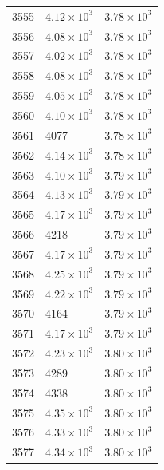 \begin{table}[H]
\begin{tabular}{lll}
3555 & $\displaystyle 4.12 \times 10^{3}$ & $\displaystyle 3.78 \times 10^{3}$ \\
3556 & $\displaystyle 4.08 \times 10^{3}$ & $\displaystyle 3.78 \times 10^{3}$ \\
3557 & $\displaystyle 4.02 \times 10^{3}$ & $\displaystyle 3.78 \times 10^{3}$ \\
3558 & $\displaystyle 4.08 \times 10^{3}$ & $\displaystyle 3.78 \times 10^{3}$ \\
3559 & $\displaystyle 4.05 \times 10^{3}$ & $\displaystyle 3.78 \times 10^{3}$ \\
3560 & $\displaystyle 4.10 \times 10^{3}$ & $\displaystyle 3.78 \times 10^{3}$ \\
3561 & 4077 & $\displaystyle 3.78 \times 10^{3}$ \\
3562 & $\displaystyle 4.14 \times 10^{3}$ & $\displaystyle 3.78 \times 10^{3}$ \\
3563 & $\displaystyle 4.10 \times 10^{3}$ & $\displaystyle 3.79 \times 10^{3}$ \\
3564 & $\displaystyle 4.13 \times 10^{3}$ & $\displaystyle 3.79 \times 10^{3}$ \\
3565 & $\displaystyle 4.17 \times 10^{3}$ & $\displaystyle 3.79 \times 10^{3}$ \\
3566 & 4218 & $\displaystyle 3.79 \times 10^{3}$ \\
3567 & $\displaystyle 4.17 \times 10^{3}$ & $\displaystyle 3.79 \times 10^{3}$ \\
3568 & $\displaystyle 4.25 \times 10^{3}$ & $\displaystyle 3.79 \times 10^{3}$ \\
3569 & $\displaystyle 4.22 \times 10^{3}$ & $\displaystyle 3.79 \times 10^{3}$ \\
3570 & 4164 & $\displaystyle 3.79 \times 10^{3}$ \\
3571 & $\displaystyle 4.17 \times 10^{3}$ & $\displaystyle 3.79 \times 10^{3}$ \\
3572 & $\displaystyle 4.23 \times 10^{3}$ & $\displaystyle 3.80 \times 10^{3}$ \\
3573 & 4289 & $\displaystyle 3.80 \times 10^{3}$ \\
3574 & 4338 & $\displaystyle 3.80 \times 10^{3}$ \\
3575 & $\displaystyle 4.35 \times 10^{3}$ & $\displaystyle 3.80 \times 10^{3}$ \\
3576 & $\displaystyle 4.33 \times 10^{3}$ & $\displaystyle 3.80 \times 10^{3}$ \\
3577 & $\displaystyle 4.34 \times 10^{3}$ & $\displaystyle 3.80 \times 10^{3}$ \\

\end{tabular}
\end{table}

